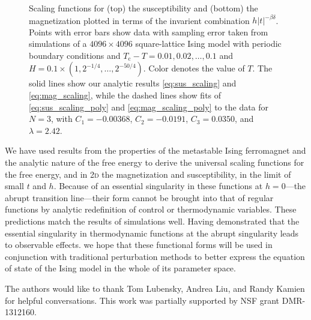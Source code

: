 \documentclass[aps,prl,reprint]{revtex4-1}
\def\arcsinh{\mathop{\mathrm{arcsinh}}\nolimits}
\def\arccosh{\mathop{\mathrm{arccosh}}\nolimits}
\def\c{\mathrm c}
\def\fM{\mathcal M}  %
\def\sq{\mathrm{sq}}
\def\twodee{\textsc{2d} }
\begin{document}

\begin{figure}
  
  \caption{
    Scaling functions for (top) the susceptibility and (bottom) the
    magnetization plotted in terms of the invarient combination
    $h|t|^{-\beta\delta}$. Points with error bars show data with
    sampling error taken from simulations of a $4096\times4096$
    square-lattice Ising model with periodic boundary conditions and $T_\c-T=0.01,0.02,\ldots,0.1$ and
    $H=0.1\times(1,2^{-1/4},\ldots,2^{-50/4})$. Color denotes the value of
    $T$. The solid lines show our
    analytic results \eqref{eq:sus_scaling} and \eqref{eq:mag_scaling}, while
    the dashed lines show fits of \eqref{eq:sus_scaling_poly} and
    \eqref{eq:mag_scaling_poly} to the data for $N=3$, with $C_1=-0.00368$,
    $C_2=-0.0191$, $C_3=0.0350$, and $\lambda=2.42$.
  }
  \label{fig:scaling_fits}
\end{figure}

We have used results from the properties of the metastable Ising ferromagnet
and the analytic nature of the free energy to derive the universal scaling
functions for the free energy, and in \twodee the magnetization and
susceptibility, in the limit of small $t$ and $h$. Because of an essential
singularity in these functions at $h=0$---the abrupt transition line---their
form cannot be brought into that of regular functions by analytic redefinition of control or thermodynamic
variables. These predictions match the results of simulations well. Having
demonstrated that the essential singularity in thermodynamic functions at the
abrupt singularity leads to observable effects. we hope that these functional
forms will be used in conjunction with traditional perturbation methods to
better express the equation of state of the Ising model in the whole of its
parameter space.

\begin{acknowledgments}
  The authors would like to thank Tom Lubensky, Andrea Liu, and Randy Kamien
  for helpful conversations. This work was partially supported by NSF grant
  DMR-1312160.
\end{acknowledgments}


\end{document}
